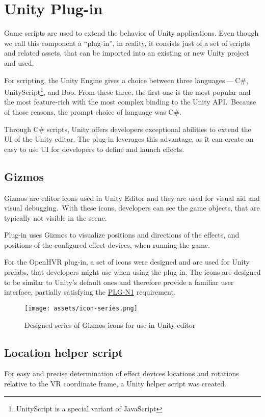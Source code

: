 \section{Unity Plug-in}
Game scripts are used to extend the behavior of Unity applications. Even though
we call this component a ``plug-in'', in reality, it consists just of a
set of scripts and related assets, that can be imported into an existing
or new Unity project and used.


For scripting, the Unity Engine gives a choice between three languages — C\#, 
UnityScript\footnote{UnityScript is a special variant of JavaScript}, and
Boo. From these three, the first one is the most popular and the most
feature-rich with the most complex binding to the Unity API.\,\cite{unityblog}
Because of those reasons, the prompt choice of language was C\#.


Through C\# scripts, Unity offers developers exceptional abilities to extend
the UI of the Unity editor. The plug-in leverages this advantage, as it can
create an easy to use UI for developers to define and launch effects.


\subsection{Gizmos}
Gizmos are editor icons used in Unity Editor and they are used for
visual aid and visual debugging.\,\cite{gizmos}
With these icons, developers can see the game objects, that are
typically not visible in the scene.


Plug-in uses Gizmos to visualize positions and directions of the
effects, and positions of the configured effect devices, when running the game.


For the OpenHVR plug-in, a set of icons were designed and are used for
Unity prefabs, that developers might use when using the plug-in. The icons
are designed to be similar to Unity’s default ones and therefore provide
a familiar user interface, partially satisfying the 
\hyperref[plg-n1]{PLG-N1} requirement.


\begin{figure}[h]{}
    \vspace{1em}
\centering\texttt{[image: assets/icon-series.png]}
\caption{Designed series of Gizmos icons for use in Unity editor}

\end{figure}

\hypertarget{x-location-helper-script}{\subsection{Location helper script}}
For easy and precise determination of effect devices locations and rotations
relative to the VR coordinate frame, a Unity helper script was created.


